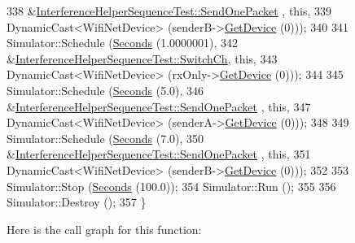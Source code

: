 \begin{DoxyCode}
338                        &\hyperlink{classInterferenceHelperSequenceTest_a500c7f3465551b4e5f46d59c0fccc0eb}{InterferenceHelperSequenceTest::SendOnePacket}
      , \textcolor{keyword}{this},
339                        DynamicCast<WifiNetDevice> (senderB->\hyperlink{classns3_1_1Node_a5918dfd24ef632efc9a83a5f6561c76e}{GetDevice} (0)));
340 
341   Simulator::Schedule (\hyperlink{group__timecivil_ga33c34b816f8ff6628e33d5c8e9713b9e}{Seconds} (1.0000001),
342                        &\hyperlink{classInterferenceHelperSequenceTest_a234954d61db7af02e56247aec19ca33d}{InterferenceHelperSequenceTest::SwitchCh}, \textcolor{keyword}{
      this},
343                        DynamicCast<WifiNetDevice> (rxOnly->\hyperlink{classns3_1_1Node_a5918dfd24ef632efc9a83a5f6561c76e}{GetDevice} (0)));
344 
345   Simulator::Schedule (\hyperlink{group__timecivil_ga33c34b816f8ff6628e33d5c8e9713b9e}{Seconds} (5.0),
346                        &\hyperlink{classInterferenceHelperSequenceTest_a500c7f3465551b4e5f46d59c0fccc0eb}{InterferenceHelperSequenceTest::SendOnePacket}
      , \textcolor{keyword}{this},
347                        DynamicCast<WifiNetDevice> (senderA->\hyperlink{classns3_1_1Node_a5918dfd24ef632efc9a83a5f6561c76e}{GetDevice} (0)));
348 
349   Simulator::Schedule (\hyperlink{group__timecivil_ga33c34b816f8ff6628e33d5c8e9713b9e}{Seconds} (7.0),
350                        &\hyperlink{classInterferenceHelperSequenceTest_a500c7f3465551b4e5f46d59c0fccc0eb}{InterferenceHelperSequenceTest::SendOnePacket}
      , \textcolor{keyword}{this},
351                        DynamicCast<WifiNetDevice> (senderB->\hyperlink{classns3_1_1Node_a5918dfd24ef632efc9a83a5f6561c76e}{GetDevice} (0)));
352 
353   Simulator::Stop (\hyperlink{group__timecivil_ga33c34b816f8ff6628e33d5c8e9713b9e}{Seconds} (100.0));
354   Simulator::Run ();
355 
356   Simulator::Destroy ();
357 \}
\end{DoxyCode}


Here is the call graph for this function\+:


